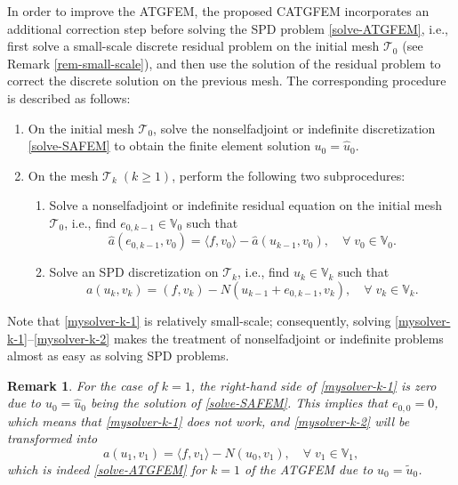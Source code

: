 \documentclass[preprint,times]{elsarticle}%
\newtheorem{remark}{Remark}[section]
\numberwithin{algorithm}{section}
\numberwithin{equation}{section}
\newcommand{\ha}{\hat{a}}
\newcommand{\hu}{\hat{u}}
\newcommand{\tu}{\tilde{u}}
\newcommand{\mcT}{\mathcal{T}}
\newcommand{\mbV}{\mathbb{V}}
\begin{document}
In order to improve the ATGFEM, the proposed CATGFEM incorporates an additional correction step before solving the SPD problem \eqref{solve-ATGFEM}, i.e., first solve a small-scale discrete residual problem on the initial mesh $\mcT_0$ (see Remark \ref{rem-small-scale}), and then use the solution of the residual problem to correct the discrete solution on the previous mesh. The corresponding procedure is described as follows: 
\begin{enumerate}
\itemsep = 0pt \parskip = 0pt
\item On the initial mesh $\mcT_0$, solve the nonselfadjoint or indefinite discretization \eqref{solve-SAFEM} to obtain the finite element solution $u_0 = \hu_0$. 
\item On the mesh $\mcT_k\;(k \geqslant 1)$, perform the following two subprocedures: 
\begin{enumerate}[(1)]
	\itemsep = 0pt \parskip = 0pt
	\item Solve a nonselfadjoint or indefinite residual equation on the initial mesh $\mcT_0$, i.e., find $e_{0,k-1} \in \mbV_0$ such that 
	\begin{equation}\label{mysolver-k-1}
		\ha(e_{0,k-1},v_0) = \langle f,v_0 \rangle - \ha(u_{k-1},v_0), \quad \forall \; v_0 \in \mbV_0.
	\end{equation}
	\item Solve an SPD discretization on $\mcT_k$, i.e., find $u_k \in \mbV_k$ such that
	\begin{equation}\label{mysolver-k-2}
		a(u_k,v_k) = (f,v_k) - N(u_{k-1}+e_{0,k-1},v_k), \quad \forall\; v_k \in \mbV_k. 
	\end{equation}
\end{enumerate}
\end{enumerate}
Note that \eqref{mysolver-k-1} is relatively small-scale; consequently, solving \eqref{mysolver-k-1}--\eqref{mysolver-k-2} makes the treatment of nonselfadjoint or indefinite problems almost as easy as solving SPD problems. 

\begin{remark}\label{rem-CATG-1}For the case of $k = 1$, the right-hand side of \eqref{mysolver-k-1} is zero due to $u_0 = \hu_0$ being the solution of \eqref{solve-SAFEM}. This implies that $e_{0,0} = 0$, which means that \eqref{mysolver-k-1} does not work, and \eqref{mysolver-k-2} will be transformed into 
\begin{equation}\label{solve-CATGFEM-1}
	a(u_1,v_1) = \langle f, v_1 \rangle - N(u_0,v_1), \quad \forall \; v_1 \in \mbV_1, 
\end{equation}
which is indeed \eqref{solve-ATGFEM} for $k=1$ of the ATGFEM due to $u_0 = \tu_0$.  
\end{remark}
\end{document}
